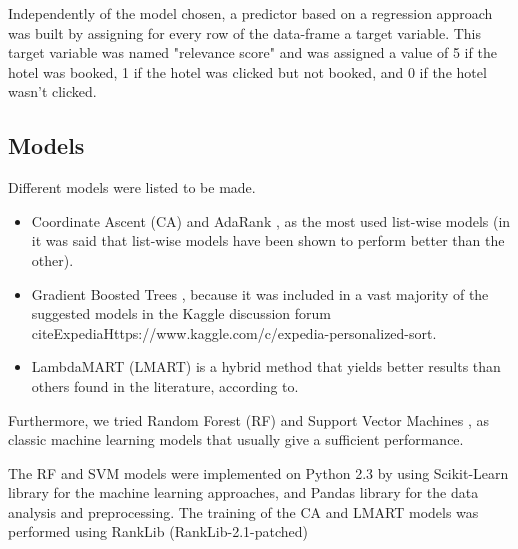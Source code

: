 \documentclass[9pt]{llncs}
\begin{document}
Independently of the model chosen, a predictor based on a regression approach was built by assigning for every row of the data-frame a target variable. This target variable was named "relevance score" and was assigned a value of 5 if the hotel was booked, 1 if the hotel was clicked but not booked, and 0 if the hotel wasn't clicked.


\subsection{Models}
Different models were listed to be made.
\begin{itemize}
\item Coordinate Ascent (CA) \cite{CA} and AdaRank \cite{Ada}, as the most used list-wise models (in \cite{Cao2007LearningApproach} it was said that list-wise models have been shown to perform better than the other).
\item Gradient Boosted Trees \cite{XGB}, because it was included in a vast majority of the suggested models in the Kaggle discussion forum cite{ExpediaHttps://www.kaggle.com/c/expedia-personalized-sort}.
\item LambdaMART (LMART) \cite{MART} is a hybrid method that yields better results than others found in the literature, according to.
\end{itemize}



Furthermore, we tried Random Forest (RF) \cite{Breiman2001}
and Support Vector Machines \cite{Cristianini2000}
, as classic  machine learning models that usually give a sufficient performance.

The RF and SVM models were implemented on Python 2.3 by using Scikit-Learn library \cite{Pedregosa2011Scikit-learn:Python} for the machine learning approaches, and Pandas library \cite{McKinney2015PandasToolkit} for the data analysis and preprocessing. 
The training of the CA and LMART models was performed using RankLib (RankLib-2.1-patched) \cite{Lemur}

\end{document}
